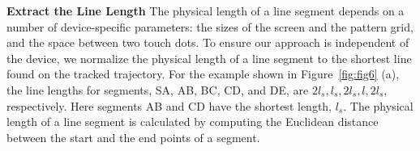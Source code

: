         \noindent \textbf{Extract the Line Length}
        The physical length of a line segment depends
        on a number of device-specific parameters: the sizes of the screen and the pattern grid, and the space between two touch dots.
        To ensure our approach is independent of the device, we normalize the physical length of a line segment to the
        shortest line found on the tracked trajectory. For the
        example shown in Figure~\ref{fig:fig6} (a), the line lengths for segments, SA, AB, BC, CD, and DE, are $2l_{s},l_{s},2l_{s},l,2l_{s}$, respectively.
        Here segments AB and CD have the shortest length, $l_s$. The physical length of a line segment is calculated by computing the
        Euclidean distance between the start and the end points of a segment.

        \begin{figure}[!t]
            \centering
            \hspace{0.2cm}
\end{figure}
